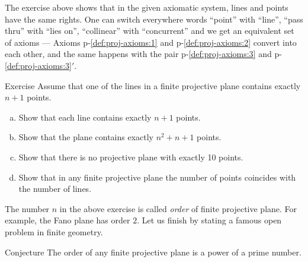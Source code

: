 The exercise above shows that in the given axiomatic system,
lines and points have the same rights.
One can switch everywhere words ``point'' with ``line'', ``pass thru'' with ``lies on'', ``collinear'' with ``concurrent'' and we get an equivalent set of axioms ---  Axioms p-\ref{def:proj-axioms:1} and p-\ref{def:proj-axioms:2} convert into each other,
and the same happens with the pair p-\ref{def:proj-axioms:3} and p-\ref{def:proj-axioms:3}$'$.

\begin{thm}{Exercise}\label{ex:oder}
Assume that one of the lines in a finite projective plane contains exactly $n+1$ points.
\begin{enumerate}[(a)]
\item\label{ex:oder:a} Show that each line contains exactly $n+1$ points.
\item\label{ex:oder:b} Show that the plane contains  exactly $n^2+n+1$ points.
\item\label{ex:oder:c} Show that there is no projective plane with exactly 10 points.
\item\label{ex:oder:d} Show that in any finite projective plane the number of points coincides with the number of lines.
\end{enumerate}
\end{thm}

The number $n$ in the above exercise is called \emph{order} of finite projective plane.
For example, the Fano plane has order $2$.
Let us finish by stating a famous open problem in finite geometry.

\begin{thm}{Conjecture}
The order of any finite projective plane is a power of a prime number.
\end{thm}
